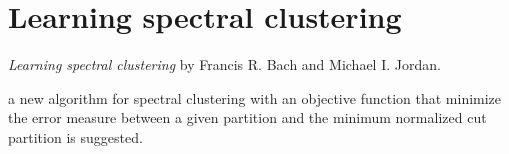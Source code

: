 \section{Learning spectral clustering}
\label{ch:jordan04}

\textit{Learning spectral clustering} by Francis R. Bach and Michael I. Jordan.
\newline

a new algorithm for spectral clustering with an objective function that minimize the error measure between a given partition and the minimum normalized cut partition is suggested.


